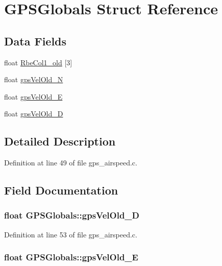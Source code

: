 \hypertarget{struct_g_p_s_globals}{\section{G\-P\-S\-Globals Struct Reference}
\label{struct_g_p_s_globals}
}
\subsection*{Data Fields}
\begin{DoxyCompactItemize}
\item 
float \hyperlink{struct_g_p_s_globals_a838fd35b2b5e092ed234f1e023a8a171}{Rbe\-Col1\-\_\-old} \mbox{[}3\mbox{]}
\item 
float \hyperlink{struct_g_p_s_globals_aed518d0e767d4418cae161cd79bcbb14}{gps\-Vel\-Old\-\_\-\-N}
\item 
float \hyperlink{struct_g_p_s_globals_af55098326f4e20fe87b1afcf1445d1f0}{gps\-Vel\-Old\-\_\-\-E}
\item 
float \hyperlink{struct_g_p_s_globals_a6e70b296af14e6a6535a67619bf2b915}{gps\-Vel\-Old\-\_\-\-D}
\end{DoxyCompactItemize}


\subsection{Detailed Description}


Definition at line 49 of file gps\-\_\-airspeed.\-c.



\subsection{Field Documentation}
\hypertarget{struct_g_p_s_globals_a6e70b296af14e6a6535a67619bf2b915}{
\subsubsection[{gps\-Vel\-Old\-\_\-\-D}]{\setlength{\rightskip}{0pt plus 5cm}float G\-P\-S\-Globals\-::gps\-Vel\-Old\-\_\-\-D}}\label{struct_g_p_s_globals_a6e70b296af14e6a6535a67619bf2b915}


Definition at line 53 of file gps\-\_\-airspeed.\-c.

\hypertarget{struct_g_p_s_globals_af55098326f4e20fe87b1afcf1445d1f0}{
\subsubsection[{gps\-Vel\-Old\-\_\-\-E}]{\setlength{\rightskip}{0pt plus 5cm}float G\-P\-S\-Globals\-::gps\-Vel\-Old\-\_\-\-E}}\label{struct_g_p_s_globals_af55098326f4e20fe87b1afcf1445d1f0}


